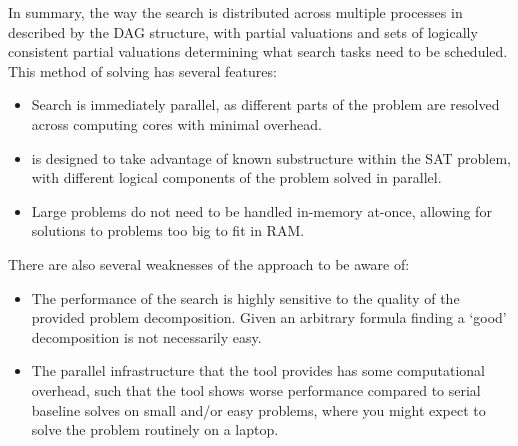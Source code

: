 \documentclass[
10pt, %
a4paper, %
oneside, %
headinclude,footinclude, %
BCOR5mm, %
]{scrartcl}
\begin{document}
In summary, the way the search is distributed across multiple processes in described by the DAG structure, with partial valuations and sets of logically consistent partial valuations determining what search tasks need to be scheduled.
This method of solving has several features:
\begin{itemize}
\item	Search is immediately parallel, as different parts of the problem are resolved across computing cores with minimal overhead.
\item	\dagster is designed to take advantage of known substructure within the SAT problem, with different logical components of the problem solved in parallel.
\item	Large problems do not need to be handled in-memory at-once, allowing for solutions to problems too big to fit in RAM.
\end{itemize}
There are also several weaknesses of the approach to be aware of:
\begin{itemize}
\item The performance of the search is highly sensitive to the quality of the provided problem decomposition.
Given an arbitrary formula finding a `good' decomposition is not necessarily easy.
\item	The parallel infrastructure that the tool provides has some computational overhead, such that the tool shows worse performance compared to serial baseline solves on small and/or easy problems, where you might expect to solve the problem routinely on a laptop.
\end{itemize}
\end{document}

